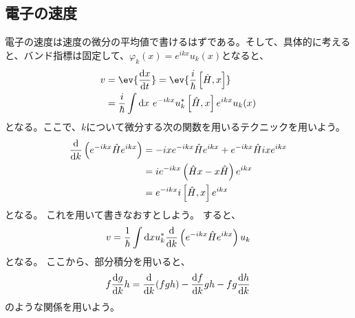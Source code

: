 \documentclass[titlepage]{ltjsarticle}
\begin{document}
\subsection{電子の速度}
電子の速度は速度の微分の平均値で書けるはずである。そして、具体的に考えると、バンド指標は固定して、\(\varphi_{k}(x) = e^{ikx} u_k(x)\)となると、
\begin{align}
  v & = \ev{\odv{x}{t}} = \ev{\frac{i}{\hbar}\left[ \hat{H} , x \right]}\\
  & = \frac{i}{\hbar} \int \odif{x} \ e^{-ikx} u^\ast_k\left[ \hat{H}, x \right]e^{ikx} u_k(x)
\end{align}
となる。ここで、\(k\)について微分する次の関数を用いるテクニックを用いよう。
\begin{align}
  \odv{}{k} \left( e^{-ikx} \hat{H} e^{ikx} \right)& = -ix e^{-ikx} \hat{H} e^{ikx} + e^{-ikx} \hat{H} i x e^{ikx} \\
  & = i e^{-ikx} \left( \hat{H}x - x \hat{H} \right)e^{ikx} \\
  & = e^{-ikx} i \left[ \hat{H},x  \right] e^{ikx}
\end{align}
となる。
これを用いて書きなおすとしよう。
すると、
\begin{equation}
  v= \frac{1}{\hbar} \int \odif{x}  u^*_k \odv{}{k} \left( e^{-ikx} \hat{H} e^{ikx} \right)u_k
\end{equation}
となる。
ここから、部分積分を用いると、
\begin{equation}
  f \odv{g}{k}h = \odv{}{k} (fgh) - \odv{f}{k}gh - f g \odv{h}{k}
\end{equation}
のような関係を用いよう。
\end{document}
